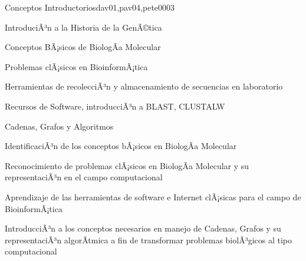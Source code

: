 \begin{syllabus}
\begin{unit}{Conceptos Introductorios}{dav01,pav04,pete00}{0}{3}
\begin{topics}
        \item IntroduciÃ³n a la Historia de la GenÃ©tica
        \item Conceptos BÃ¡sicos de BiologÃ­a Molecular
        \item Problemas clÃ¡sicos en BioinformÃ¡tica
        \item Herramientas de recolecciÃ³n y almacenamiento de secuencias en laboratorio
        \item Recursos de Software, introducciÃ³n a BLAST, CLUSTALW
        \item Cadenas, Grafos y Algoritmos
    \end{topics}
    \begin{learningoutcomes}
        \item IdentificaciÃ³n de los conceptos bÃ¡sicos en BiologÃ­a Molecular
        \item Reconocimiento de problemas clÃ¡sicos en BiologÃ­a Molecular y su representaciÃ³n en el campo computacional
        \item Aprendizaje de las herramientas de software e Internet clÃ¡sicas para el campo de BioinformÃ¡tica
        \item IntroducciÃ³n a los conceptos necesarios en manejo de Cadenas, Grafos y su representaciÃ³n algorÃ­tmica a fin de transformar problemas biolÃ³gicos al tipo computacional
    \end{learningoutcomes}
\end{unit}


\end{syllabus}
